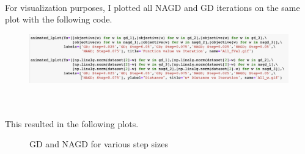 \documentclass[12pt, letterpaper]{article}
\begin{document}
\\
For visualization purposes, I plotted all NAGD and GD iterations on the same plot with the following code.\\
\begin{figure}[h!]
  \centering
  \includegraphics[scale=0.5]{./img/gd_nagd_plots}
\end{figure}\\
\\
This resulted in the following plots.\\
\begin{figure}[h!]%
    \centering
    \qquad
    \caption{GD and NAGD for various step sizes}%
    \label{fig:example}%
\end{figure}\\
\\\\\\\\
\end{document}
